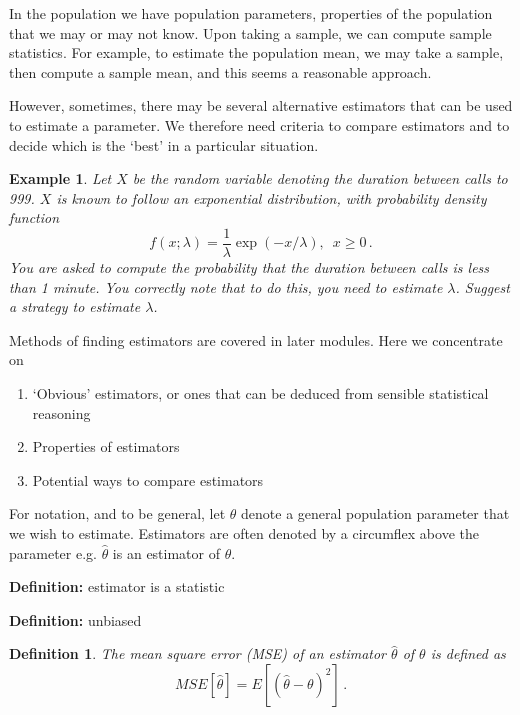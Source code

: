 \documentclass[12pt]{article}
\newtheorem{definition}[theorem]{Definition}
\newtheorem{example}[theorem]{Example}
\begin{document}
In the population we have population parameters, properties of the population that we may or may not know. Upon taking a sample, we can compute sample statistics. For example, to estimate the population mean, we may take a sample, then compute a sample mean, and this seems a reasonable approach.

However, sometimes, there may be several alternative estimators that can be used to estimate a parameter. We therefore need criteria to compare estimators and to decide which is the `best' in a particular situation.

\begin{example}
Let $X$ be the random variable denoting the duration between calls to 999. $X$ is known to follow an exponential distribution, with probability density function
\begin{equation*}
f(x;\lambda)=\frac{1}{\lambda}\exp(-x/\lambda), \,\,\, x \geq 0 \, .
\end{equation*}
You are asked to compute the probability that the duration between calls is less than 1 minute. You correctly note that to do this, you need to estimate $\lambda$. Suggest a strategy to estimate $\lambda$.
\end{example}

Methods of finding estimators are covered in later modules. Here we concentrate on
\begin{enumerate}
\item `Obvious' estimators, or ones that can be deduced from sensible statistical reasoning
\item Properties of estimators
\item Potential ways to compare estimators
\end{enumerate}

For notation, and to be general, let $\theta$ denote a general population parameter that we wish to estimate. Estimators are often denoted by a circumflex above the parameter e.g. $\hat{\theta}$ is an estimator of $\theta$.
\begin{mdframed}
{\bf Definition:}
\textcolor[rgb]{1.00,1.00,1.00}{estimator is a statistic\lipsum[1-2]}
\end{mdframed}

\begin{mdframed}
{\bf Definition:}
\textcolor[rgb]{1.00,1.00,1.00}{unbiased \lipsum[1-2]}
\end{mdframed}

\begin{definition}
The mean square error (MSE) of an estimator $\hat{\theta}$ of $\theta$ is defined as $$MSE[\hat{\theta}]=E \left[(\hat{\theta}-\theta)^{2}\right] \,.$$
\end{definition}
\end{document}
